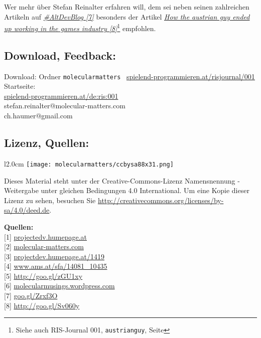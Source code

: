 \documentclass[10pt,a4paper,ngerman,twoside]{article} %
\begin{document}
Wer mehr über Stefan Reinalter erfahren will, dem sei neben seinen zahlreichen Artikeln auf \href{http://www.altdevblogaday.com/author/stefan-reinalter/}{\textit{\#AltDevBlog [7]}} besonders der Artikel \href{http://www.altdevblogaday.com/2011/09/27/how-the-austrian-guy-ended-up-working-in-the-games-industry/}{\textit{How the austrian guy ended up working in the games industry [8]}}\footnote{Siehe auch RIS-Journal 001, \texttt{austrianguy}, Seite \pageref{austrianguy}} empfohlen.

\subsection*{Download, Feedback:}
\footnotesize{
Download: Ordner \texttt{molecularmatters} \Mundus\ \href{http://spielend-programmieren.at/risjournal/001}{spielend-programmieren.at/risjournal/001}\\
Startseite:\\
\href{http://spielend-programmieren.at/de:ris:001}{spielend-programmieren.at/de:ris:001}\\ 
\Letter\: stefan.reinalter@molecular-matters.com\\
\Letter\: ch.haumer@gmail.com\\}
\normalsize 

\subsection*{Lizenz, Quellen:}

\begin{wrapfigure}{l}{2.0cm}
\texttt{[image: molecularmatters/ccbysa88x31.png]}
\end{wrapfigure}
Dieses Material steht unter der Creative-Commons-Lizenz Namensnennung - Weitergabe unter gleichen Bedingungen 4.0 International. Um eine Kopie dieser Lizenz zu sehen, besuchen Sie \url{http://creativecommons.org/licenses/by-sa/4.0/deed.de}.

\textbf{Quellen:} \\
{[}1{]} \href{http://projectdev.humepage.at/}{projectedv.humepage.at} \\
{[}2{]} \href{http://www.molecular-matters.com/}{molecular-matters.com} \\
{[}3{]} \href{http://projectdev.humepage.at/1419}{projectdev.humepage.at/1419} \\
{[}4{]} \href{http://www.ams.at/sfa/14081_10435.html}{www.ams.at/sfa/14081\_10435} \\
{[}5{]} \href{https://www.gruenderservice.at/Content.Node/gruenden/Jungunternehmerfoerderungen.html}{http://goo.gl/zGU1xy} \\
{[}6{]} \href{http://molecularmusings.wordpress.com/}{molecularmusings.wordpress.com} \\
{[}7{]} \href{http://www.altdevblogaday.com/author/stefan-reinalter/}{goo.gl/Zrxf3O} \\
{[}8{]} \href{http://www.altdevblogaday.com/2011/09/27/how-the-austrian-guy-ended-up-working-in-the-games-industry/}{http://goo.gl/Sv060y} 





\end{document}
